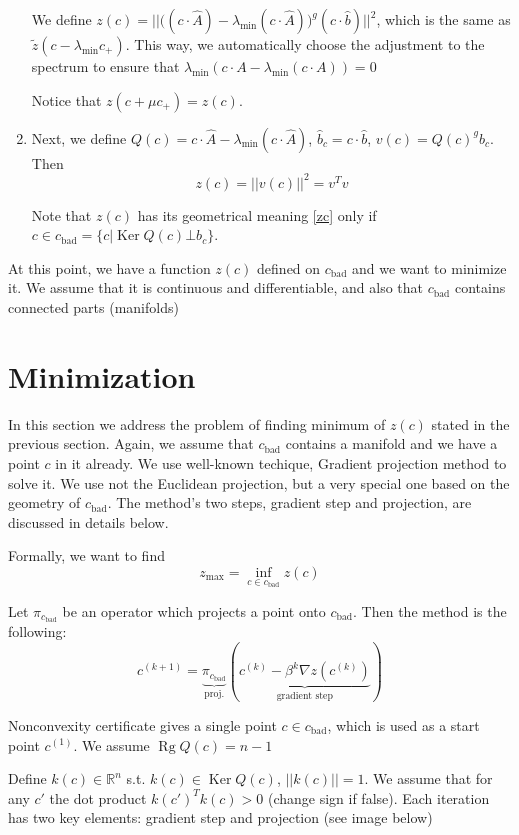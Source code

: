 \documentclass[a4paper]{article}
\DeclareMathOperator{\Rg}{Rg}
\DeclareMathOperator{\Ker}{Ker}
\newcommand{\cbad}{c_{\mathrm{bad}}}
\begin{document}
\begin{enumerate}
We define $z(c)=||\big((c\cdot \hat{A})-\lambda_{\min}(c\cdot \hat{A})\big)^g(c\cdot \hat{b})||^2$, which is the same as $\tilde{z}(c-\lambda_{\min}c_+)$. This way, we automatically choose the adjustment to the spectrum to ensure that $\lambda_{\min}(c\cdot A-\lambda_{\min}(c\cdot A))=0$

Notice that $z(c+\mu c_+)=z(c)$.

\item Next, we define $Q(c)=c\cdot \hat{A}-\lambda_{\min}(c\cdot \hat{A})$, $\hat{b}_c=c\cdot \hat{b}$, $v(c)=Q(c)^gb_c$. Then $$z(c)=||v(c)||^2=v^Tv$$

Note that $z(c)$ has its geometrical meaning \ref{zc} only if $c\in\cbad=\{c\big|\Ker Q(c)\bot b_c\}$.
\end{enumerate}

At this point, we have a function $z(c)$ defined on $\cbad$ and we want to minimize it. We assume that it is continuous and differentiable, and also that $\cbad$ contains connected parts (manifolds)

\section{Minimization}
In this section we address the problem of finding minimum of $z(c)$ stated in the previous section. Again, we assume that $\cbad$ contains a manifold and we have a point $c$ in it already. We use well-known techique, Gradient projection method to solve it. We use not the Euclidean projection, but a very special one based on the geometry of $\cbad$. The method's two steps, gradient step and projection, are discussed in details below.

Formally, we want to find
\begin{equation}
z_{\max}=\inf\limits_{c\in\cbad}z(c)
\end{equation}

Let $\pi_{\cbad}$ be an operator which projects a point onto $\cbad$. Then the method is the following:
$$c^{(k+1)}=\underbrace{\pi_{\cbad}}_{\mathrm{proj.}}(\underbrace{c^{(k)}-\beta^k \nabla z(c^{(k)})}_{\mathrm{gradient \,\,step}})$$


Nonconvexity certificate gives a single point $c\in \cbad$, which is used as a start point $c^{(1)}$. We assume $\Rg Q(c)=n-1$

Define $k(c)\in\mathbb{R}^n$ s.t. $k(c)\in\Ker Q(c)$, $||k(c)||=1$. We assume that for any $c'$ the dot product $k(c')^Tk(c)>0$ (change sign if false).
Each iteration has two key elements: gradient step and projection (see image below)
\end{document}
